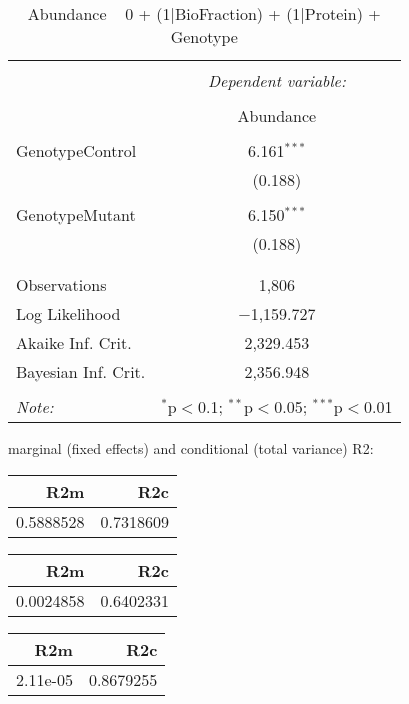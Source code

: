 \documentclass[11pt]{report}
\begin{document}
\begin{table}[!htbp] \centering 
  \caption{Abundance ~ 0 + (1|BioFraction) + (1|Protein) + Genotype} 
  \label{} 
\begin{tabular}{@{\extracolsep{5pt}}lc} 
\\[-1.8ex]\hline 
\hline \\[-1.8ex] 
 & \multicolumn{1}{c}{\textit{Dependent variable:}} \\ 
\cline{2-2} 
\\[-1.8ex] & Abundance \\ 
\hline \\[-1.8ex] 
 GenotypeControl & 6.161$^{***}$ \\ 
  & (0.188) \\ 
  & \\ 
 GenotypeMutant & 6.150$^{***}$ \\ 
  & (0.188) \\ 
  & \\ 
\hline \\[-1.8ex] 
Observations & 1,806 \\ 
Log Likelihood & $-$1,159.727 \\ 
Akaike Inf. Crit. & 2,329.453 \\ 
Bayesian Inf. Crit. & 2,356.948 \\ 
\hline 
\hline \\[-1.8ex] 
\textit{Note:}  & \multicolumn{1}{r}{$^{*}$p$<$0.1; $^{**}$p$<$0.05; $^{***}$p$<$0.01} \\ 
\end{tabular} 
\end{table} 
marginal (fixed effects) and conditional (total variance) R2:

\begin{tabular}{r|r}
\hline
R2m & R2c\\
\hline
0.5888528 & 0.7318609\\
\hline
\end{tabular}

\begin{tabular}{r|r}
\hline
R2m & R2c\\
\hline
0.0024858 & 0.6402331\\
\hline
\end{tabular}

\begin{tabular}{r|r}
\hline
R2m & R2c\\
\hline
2.11e-05 & 0.8679255\\
\hline
\end{tabular}
\end{document}
